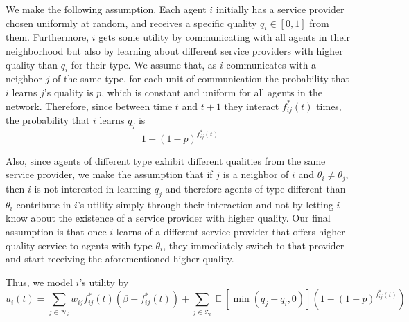 \documentclass[format=acmsmall, review=false]{acmart}
\newcommand{\Ex}{\mathop{\mathbb{E}}}
\begin{document}
\par We make the following assumption. Each agent $i$ initially has a service provider chosen uniformly at random, and receives a
specific quality $q_i \in [0, 1]$ from them. Furthermore, $i$ gets some utility by communicating with all agents in their
neighborhood but also by learning about different service providers with higher quality than $q_i$ for their type. We assume
that, as $i$ communicates with a neighbor $j$ of the same type, for each unit of communication the probability that $i$ learns
$j$'s quality is $p$, which is constant and uniform for all agents in the network. Therefore, since between time $t$ and $t+1$
they interact $f^*_{ij}(t)$ times, the probability that $i$ learns $q_j$ is
\[
1 - {\left( 1 - p \right)}^{f^*_{ij}(t)}
\]

\par Also, since agents of different type exhibit different qualities from the same service provider, we make the assumption
that if $j$ is a neighbor of $i$ and $\theta_i \neq \theta_j$, then $i$ is not interested in learning $q_j$ and therefore
agents of type different than $\theta_i$ contribute in $i$'s utility simply through their interaction and not by letting $i$
know about the existence of a service provider with higher quality. Our final assumption is that once $i$ learns of a different
service provider that offers higher quality service to agents with type $\theta_i$, they immediately switch to that provider
and start receiving the aforementioned higher quality.

\par Thus, we model $i$'s utility by
\begin{equation}\label{eq:util}
u_i(t) = \sum_{j \in \mathcal{N}_i} {w_{ij} f^*_{ij}(t) \left( \beta - f^*_{ij}(t) \right) } +
\sum_{j \in \mathcal{Z}_i} {\Ex \left[ \min \left( q_j - q_i, 0 \right) \right] \left( 1 - {\left( 1 - p \right)}^{f^*_{ij}(t)} \right) }
\end{equation}
\end{document}

